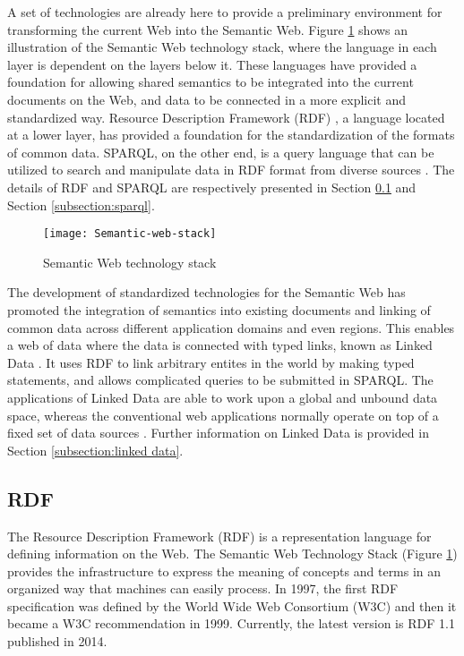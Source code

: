 A set of technologies are already here to provide a preliminary environment for transforming the current Web into the Semantic Web. Figure \ref{figure:semantic web stack} shows an illustration of the Semantic Web technology stack, where the language in each layer is dependent on the layers below it. These languages have provided a foundation for allowing shared semantics to be integrated into the current documents on the Web, and data to be connected in a more explicit and standardized way. Resource Description Framework (RDF) \cite{Cyganiak2014}, a language located at a lower layer, has provided a foundation for the standardization of the formats of common data. SPARQL, on the other end, is a query language that can be utilized to search and manipulate data in RDF format from diverse sources \cite{Harris2013}. The details of RDF and SPARQL are respectively presented in Section \ref{subsection:rdf} and Section \ref{subsection:sparql}.

\begin{figure}[h]
\texttt{[image: Semantic-web-stack]}
\centering
\caption{Semantic Web technology stack}
\label{figure:semantic web stack}
\end{figure}

The development of standardized technologies for the Semantic Web has promoted the integration of semantics into existing documents and linking of common data across different application domains and even regions. This enables a web of data where the data is connected with typed links, known as Linked Data \cite{Bizer2009}. It uses RDF to link arbitrary entites in the world by making typed statements, and allows complicated queries to be submitted in SPARQL. The applications of Linked Data are able to work upon a global and unbound data space, whereas the conventional web applications normally operate on top of a fixed set of data sources \cite{Bizer2009}. Further information on Linked Data is provided in Section \ref{subsection:linked data}.

\subsection{RDF} \label{subsection:rdf}

The Resource Description Framework (RDF) is a representation language for defining information on the Web. The Semantic Web Technology Stack (Figure \ref{figure:semantic web stack}) provides the infrastructure to express the meaning of concepts and terms in an organized way that machines can easily process. In 1997, the first RDF specification was defined by the World Wide Web Consortium (W3C) and then it became a W3C recommendation in 1999. Currently, the latest version is RDF 1.1 \cite{Cyganiak2014} published in 2014.

